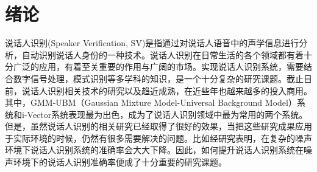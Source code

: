 \documentclass[a4paper,oneside,12pt]{book}
\begin{document}
  
\newpage

  
\newpage

  
\newpage

 
\newpage

\frontmatter\tableofcontents %

\newpage\mainmatter
{} %
\pagestyle{fancy} %

\chapter{绪论}


说话人识别(Speaker Verification, SV)是指通过对说话人语音中的声学信息进行分析，自动识别说话人身份的一种技术。说话人识别在日常生活的各个领域都有着十分广泛的应用，有着至关重要的作用与广阔的市场。实现说话人识别系统，需要结合数字信号处理，模式识别等多学科的知识，是一个十分复杂的研究课题。截止目前，说话人识别相关技术的研究以及趋近成熟，在近些年也越来越多的投入商用。其中，GMM-UBM（Gaussian Mixture Model-Universal Background Model）系统\cite{reynolds2000speaker}和i-Vector系统\cite{dehak2011front}表现最为出色，成为了说话人识别领域中最为常用的两个系统。但是，虽然说话人识别的相关研究已经取得了很好的效果，当把这些研究成果应用于实际环境的时候，仍然有很多需要解决的问题。比如经研究表明，在复杂的噪声环境下说话人识别系统的准确率会大大下降\cite{yan2016improved}。因此，如何提升说话人识别系统在噪声环境下的说话人识别准确率便成了十分重要的研究课题。
\end{document}
